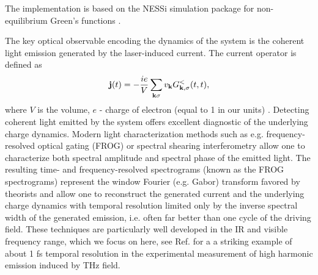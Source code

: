 The implementation is based on the NESSi simulation package for non-equilibrium Green's functions \cite{nessi}.

The key optical observable encoding the 
dynamics of the system is
the coherent light emission generated 
by the laser-induced current. The current operator is defined as
\begin{equation}
\label{Current}
{\bf j}(t)=-\dfrac{ie}{V}\sum_{{\bf k} \sigma} v_{\bf k} G_{{\bf k},\sigma}^{<}(t,t),
\end{equation}
where $V$ is the volume, $e$ - charge of electron (equal to 1 in our units)\cite{PhysRevB.84.035122}
. 
Detecting coherent light emitted by the system 
offers excellent diagnostic of the underlying 
charge dynamics. Modern light characterization methods 
such as e.g. 
frequency-resolved optical gating (FROG) \cite{Trebino_1997, Kane_1993} 
or spectral shearing interferometry \cite{Iaconis_1998} allow one to characterize both 
spectral amplitude and spectral phase of
the emitted light.
The resulting time- and frequency-resolved  
spectrograms (known as the FROG spectrograms)  
represent the window Fourier (e.g. Gabor) transform 
favored by theorists and allow one to reconstruct the 
generated current and the underlying charge dynamics with
temporal resolution limited only by the inverse spectral 
width of the generated emission, i.e. often 
far better than one cycle of the driving field. These techniques
are particularly well developed in the IR and visible frequency
range, which we focus on here, see Ref.\cite{RupertHuber_2015} for a 
a striking example of about 1 fs temporal resolution in
the experimental measurement of high harmonic
emission induced by THz field. 




